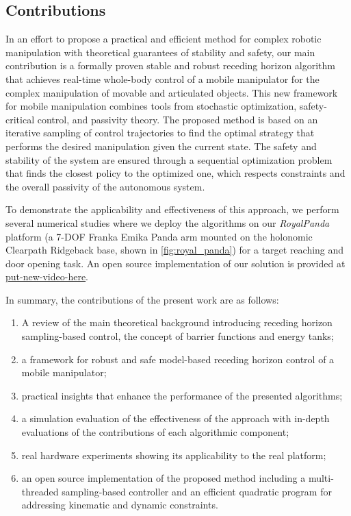\subsection{Contributions}

In an effort to propose a practical and efficient method for complex robotic manipulation with theoretical guarantees of stability and safety, our main contribution is a formally proven stable and robust receding horizon algorithm that achieves real-time whole-body control of a mobile manipulator for the complex manipulation of movable and articulated objects. This new framework for mobile manipulation combines tools from stochastic optimization, safety-critical control, and passivity theory. The proposed method is based on an iterative sampling of control trajectories to find the optimal strategy that performs the desired manipulation given the current state. The safety and stability of the system are ensured through a sequential optimization problem that finds the closest policy to the optimized one, which respects constraints and the overall passivity of the autonomous system. 


To demonstrate the applicability and effectiveness of this approach, we perform several numerical studies where we deploy the algorithms on our \textit{RoyalPanda} platform (a 7-DOF Franka Emika Panda arm mounted on the holonomic Clearpath Ridgeback base, shown in \fig\ref{fig:royal_panda}) for a target reaching and door opening task. An open source implementation of our solution is provided at \url{put-new-video-here}.

In summary, the contributions of the present work are as follows:
\begin{enumerate}
    \item A review of the main theoretical background introducing receding horizon sampling-based control, the concept of barrier functions and energy tanks;
    \item a framework for robust and safe model-based receding horizon control of a mobile manipulator;
    \item practical insights that enhance the performance of the presented algorithms;
    \item a simulation evaluation of the effectiveness of the approach with in-depth evaluations of the contributions of each algorithmic component;
    \item real hardware experiments showing its applicability to the real platform;
    \item an open source implementation of the proposed method including a multi-threaded sampling-based controller and an efficient quadratic program for addressing kinematic and dynamic constraints.
    \end{enumerate}

